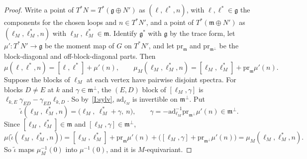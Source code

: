 \documentclass[11pt]{amsart}
\begin{document}
\begin{proof}
Write a point of $T^*N=T^*(\mathfrak g\oplus N')$ as $(\ell,\ell^*,n)$, with
$\ell,\ell^*\in\mathfrak g$ the components for the chosen loops and $n\in
T^*N'$, and a point of $T^*(\mathfrak m\oplus N')$ as $(\ell_M,\ell_M^*,n)$
with $\ell_M,\ell_M^*\in\mathfrak m$.  Identify $\mathfrak g^*$ with
$\mathfrak g$ by the trace form, let $\mu'\colon T^*N'\to\mathfrak g$ be the
moment map of $G$ on $T^*N'$, and let $\mathrm{pr}_{\mathfrak m}$ and
$\mathrm{pr}_{\mathfrak m^\perp}$ be the block-diagonal and off-block-diagonal
parts.  Then
\[
 \mu(\ell,\ell^*,n)=[\ell,\ell^*]+\mu'(n),\qquad
 \mu_M(\ell_M,\ell_M^*,n)=[\ell_M,\ell_M^*]+\mathrm{pr}_{\mathfrak m}\mu'(n).
\]
Suppose the blocks of $\ell_M$ at each vertex have pairwise disjoint spectra.
For blocks $D\neq E$ at $k$ and $\gamma\in\mathfrak m^\perp$, the $(E,D)$ block of
$[\ell_M,\gamma]$ is $\ell_{k,E}\gamma_{ED}-\gamma_{ED}\ell_{k,D}$.  So by~\ref{I:sylv},
$\mathrm{ad}_{\ell_M}$ is invertible on $\mathfrak m^\perp$.  Put
\[
 \tilde\iota(\ell_M,\ell_M^*,n)=\big(\ell_M,\ \ell_M^*+\gamma,\ n\big),\qquad
 \gamma=-\mathrm{ad}_{\ell_M}^{-1}\mathrm{pr}_{\mathfrak m^\perp}\mu'(n)\in\mathfrak
 m^\perp.
\]
Since $[\ell_M,\ell_M^*]\in\mathfrak m$ and $[\ell_M,\gamma]\in\mathfrak m^\perp$,
\[
 \mu\big(\tilde\iota(\ell_M,\ell_M^*,n)\big)=[\ell_M,\ell_M^*]
 +\mathrm{pr}_{\mathfrak m}\mu'(n)+\big([\ell_M,\gamma]+\mathrm{pr}_{\mathfrak
 m^\perp}\mu'(n)\big)=\mu_M(\ell_M,\ell_M^*,n).
\]
So $\tilde\iota$ maps $\mu_M^{-1}(0)$ into $\mu^{-1}(0)$, and it is
$M$-equivariant.


\end{proof}
\end{document}
